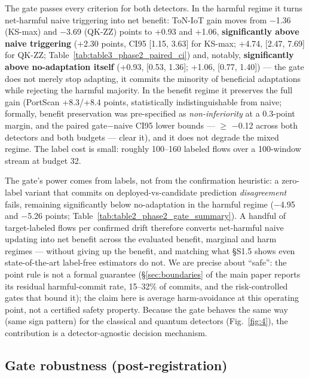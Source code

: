 \documentclass[a4paper,11pt]{article}
\makeatletter
\let\supp@subsection\subsection
\renewcommand{\subsection}{\FloatBarrier\supp@subsection}
\makeatother
\begin{document}

The gate passes every criterion for both detectors. In the harmful regime it turns net-harmful naive triggering into net benefit: ToN-IoT gain moves from $-$1.36 (KS-max) and $-$3.69 (QK-ZZ) points to +0.93 and +1.06, \textbf{significantly above naive triggering} (+2.30 points, CI95 [1.15, 3.63] for KS-max; +4.74, [2.47, 7.69] for QK-ZZ; Table~\ref{tab:table3_phase2_paired_ci}) and, notably, \textbf{significantly above no-adaptation itself} (+0.93, [0.53, 1.36]; +1.06, [0.77, 1.40]) --- the gate does not merely stop adapting, it commits the minority of beneficial adaptations while rejecting the harmful majority. In the benefit regime it preserves the full gain (PortScan +8.3/+8.4 points, statistically indistinguishable from naive; formally, benefit preservation was pre-specified as \emph{non-inferiority} at a 0.3-point margin, and the paired gate$-$naive CI95 lower bounds --- $\ge$ $-$0.12 across both detectors and both budgets --- clear it), and it does not degrade the mixed regime. The label cost is small: roughly 100--160 labeled flows over a 100-window stream at budget 32.


The gate's power comes from labels, not from the confirmation heuristic: a zero-label variant that commits on deployed-vs-candidate prediction \emph{disagreement} fails, remaining significantly below no-adaptation in the harmful regime ($-$4.95 and $-$5.26 points; Table~\ref{tab:table2_phase2_gate_summary}). A handful of target-labeled flows per confirmed drift therefore converts net-harmful naive updating into net benefit across the evaluated benefit, marginal and harm regimes --- without giving up the benefit, and matching what \S S1.5 shows even state-of-the-art label-free estimators do not. We are precise about ``safe'': the point rule is not a formal guarantee (\S\ref{sec:boundaries} of the main paper reports its residual harmful-commit rate, 15--32\% of commits, and the risk-controlled gates that bound it); the claim here is average harm-avoidance at this operating point, not a certified safety property. Because the gate behaves the same way (same sign pattern) for the classical and quantum detectors (Fig.~\ref{fig:4}), the contribution is a detector-agnostic decision mechanism.


\subsection{Gate robustness (post-registration)}
\end{document}
